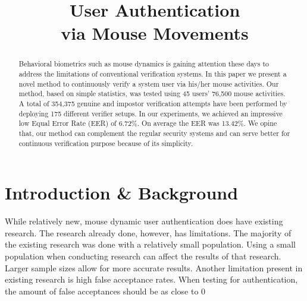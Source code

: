 \documentclass[conference]{IEEEtran}
\title{User Authentication\\via Mouse Movements}
\begin{document}
\maketitle


\begin{abstract}
Behavioral biometrics such as mouse dynamics is gaining attention these days to address the limitations of
conventional verification systems. In this paper we present a novel method to continuously verify a system user via
his/her mouse activities. Our method, based on simple statistics, was tested using 45 users’ 76,500 mouse activities.
A total of 354,375 genuine and impostor verification attempts have been performed by deploying 175 different verifier
setups. In our experiments, we achieved an impressive low Equal Error Rate (EER) of 6.72\%. On average the EER
was 13.42\%. We opine that, our method can complement the regular security systems and can serve better for
continuous verification purpose because of its simplicity.
\end{abstract}

\IEEEpeerreviewmaketitle

\section{Introduction \& Background}


While relatively new, mouse dynamic user authentication does have existing research. The research already done, however, has limitations. The majority of the existing research was done with a relatively small population. Using a small population when conducting research can affect the results of that research. Larger sample sizes allow for more accurate results. Another limitation present in existing research is high false acceptance rates. When testing for authentication, the amount of false acceptances should be as close to 0%
\end{document}

